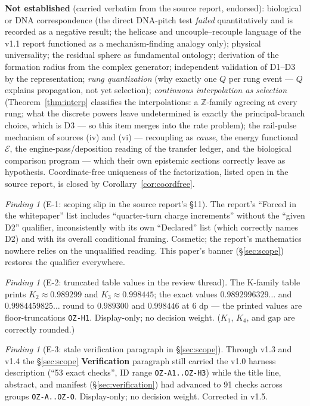 \documentclass[11pt]{article}
\newcommand{\hx}[1]{\textcolor{cC}{\footnotesize\texttt{#1}}}
\newcommand{\Z}{\mathbb{Z}}
\newcommand{\gapc}{\mathrm{gap}}
\theoremstyle{plain}
\theoremstyle{definition}
\theoremstyle{remark}
\newtheorem{finding}[theorem]{Finding}
\begin{document}
\smallskip\noindent
\textbf{Not established} (carried verbatim from the source report, endorsed):
biological or DNA correspondence (the direct DNA-pitch test \emph{failed}
quantitatively and is recorded as a negative result; the helicase and
uncouple--recouple language of the v1.1 report functioned as a mechanism-finding
analogy only); physical universality; the residual sphere as fundamental
ontology; derivation of the formation radius from the complex generator;
independent validation of D1--D3 by the representation; \emph{rung
quantization} (why exactly one $Q$ per rung event --- $Q$ explains propagation,
not yet selection); \emph{continuous interpolation as selection} (Theorem~\ref{thm:interp}
classifies the interpolations: a $\Z$-family agreeing at every rung; what the
discrete powers leave undetermined is exactly the principal-branch choice,
which is D3 --- so this item merges into the rate problem); the
rail-pulse mechanism of sources (iv) and (vi) --- recoupling as \emph{cause},
the energy functional $\mathcal E$, the engine-pass/deposition reading of the
transfer ledger, and the biological comparison program --- which their own
epistemic sections correctly leave as hypothesis.
Coordinate-free uniqueness of the factorization, listed open in the source
report, is closed by Corollary~\ref{cor:coordfree}.

\begin{finding}[E-1: scoping slip in the source report's \S11]\label{find:scope}
The report's ``Forced in the whitepaper'' list includes ``quarter-turn charge
increments'' without the ``given D2'' qualifier, inconsistently with its own
``Declared'' list (which correctly names D2) and with its overall conditional
framing. Cosmetic; the report's mathematics nowhere relies on the unqualified
reading. This paper's banner (\S\ref{sec:scope}) restores the qualifier
everywhere.
\end{finding}

\begin{finding}[E-2: truncated table values in the review thread]\label{find:trunc}
The K-family table prints $K_2\approx0.989299$ and $K_3\approx0.998445$; the
exact values $0.9892996329\ldots$ and $0.9984459825\ldots$ round to
$0.989300$ and $0.998446$ at 6 dp --- the printed values are floor-truncations
\hx{OZ-H1}. Display-only; no decision weight. ($K_1$, $K_4$, and $\gapc$ are
correctly rounded.)
\end{finding}

\begin{finding}[E-3: stale verification paragraph in \S\ref{sec:scope}]\label{find:stale}
Through v1.3 and v1.4 the \S\ref{sec:scope} \textbf{Verification}
paragraph still carried the v1.0 harness description (``53 exact checks'',
ID range \hx{OZ-A1..OZ-H3}) while the title line, abstract, and manifest
(\S\ref{sec:verification}) had advanced to 91 checks across groups
\hx{OZ-A..OZ-O}. Display-only; no decision weight. Corrected in v1.5.
\end{finding}
\end{document}
